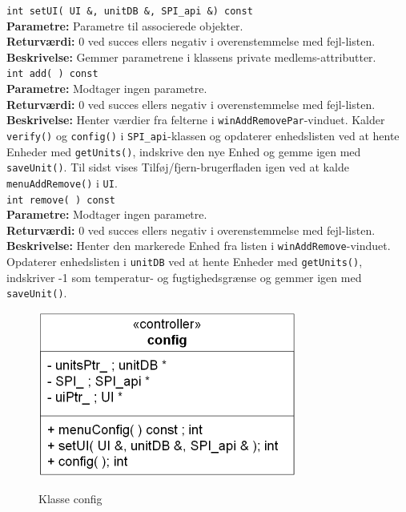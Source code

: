 \verb+int setUI( UI &, unitDB &, SPI_api &) const+ \\
\textbf{Parametre:} Parametre til associerede objekter. \\
\textbf{Returværdi:} 0 ved succes ellers negativ i overenstemmelse med fejl-listen. \\
\textbf{Beskrivelse:} Gemmer parametrene i klassens private medlems-attributter. \\

\verb+int add( ) const+ \\
\textbf{Parametre:} Modtager ingen parametre. \\
\textbf{Returværdi:} 0 ved succes ellers negativ i overenstemmelse med fejl-listen. \\
\textbf{Beskrivelse:} Henter værdier fra felterne i \verb+winAddRemovePar+-vinduet. Kalder \verb+verify()+ og \verb+config()+ i \verb+SPI_api+-klassen og opdaterer enhedslisten ved at hente Enheder med \verb+getUnits()+, indskrive den nye Enhed og gemme igen med \verb+saveUnit()+. Til sidst vises Tilføj/fjern-brugerfladen igen ved at kalde \verb+menuAddRemove()+ i \verb+UI+. \\

\verb+int remove( ) const+ \\
\textbf{Parametre:} Modtager ingen parametre. \\
\textbf{Returværdi:} 0 ved succes ellers negativ i overenstemmelse med fejl-listen. \\
\textbf{Beskrivelse:} Henter den markerede Enhed fra listen i \verb+winAddRemove+-vinduet. Opdaterer enhedslisten i \verb+unitDB+ ved at hente Enheder med \verb+getUnits()+, indskriver -1 som temperatur- og fugtighedsgrænse og gemmer igen med \verb+saveUnit()+.\\

\begin{figure}[htbp] \centering
{\includegraphics[scale=1.5]{filer/design/Klassediagrammer/sw_config}}
\caption{Klasse config}
\label{fig:config klassediagram}
\end{figure} 


